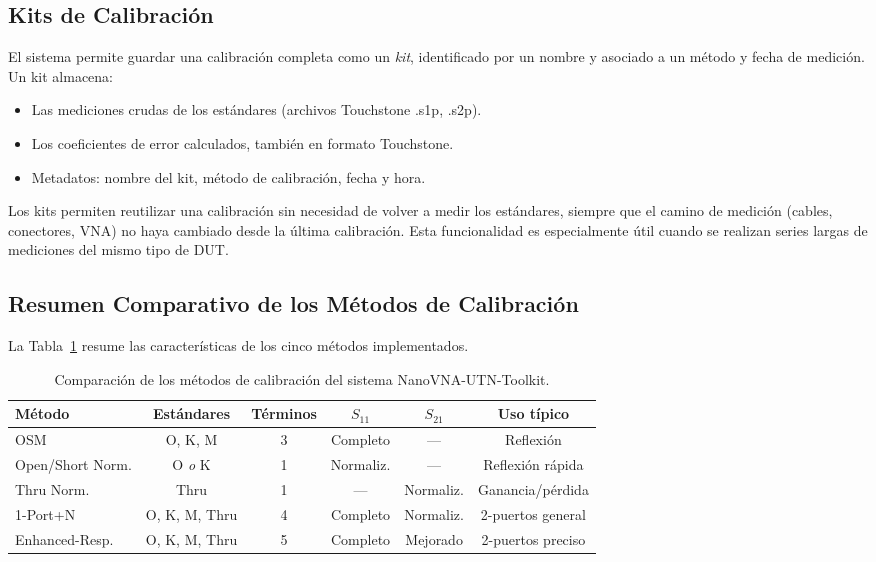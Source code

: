 \subsection{Kits de Calibración}
\label{sec:kits}

El sistema permite guardar una calibración completa como un \emph{kit},
identificado por un nombre y asociado a un método y fecha de medición.
Un kit almacena:

\begin{itemize}
    \item Las mediciones crudas de los estándares (archivos Touchstone .s1p,
          .s2p).
    \item Los coeficientes de error calculados, también en formato Touchstone.
    \item Metadatos: nombre del kit, método de calibración, fecha y hora.
\end{itemize}

Los kits permiten reutilizar una calibración sin necesidad de volver a medir
los estándares, siempre que el camino de medición (cables, conectores, VNA)
no haya cambiado desde la última calibración. Esta funcionalidad es
especialmente útil cuando se realizan series largas de mediciones del mismo
tipo de DUT.

\newpage
\Encabezado

\subsection{Resumen Comparativo de los Métodos de Calibración}
\label{sec:resumen_cal}

La Tabla~\ref{tab:comparacion_cal} resume las características de los cinco
métodos implementados.

\begin{table}[h!]
\centering
\caption{Comparación de los métodos de calibración del sistema NanoVNA-UTN-Toolkit.}
\label{tab:comparacion_cal}
\begin{tabular}{@{}lccccc@{}}
\toprule
\textbf{Método} &
\textbf{Estándares} &
\textbf{Términos} &
$S_{11}$ &
$S_{21}$ &
\textbf{Uso típico} \\
\midrule
OSM              & O, K, M        & 3 & Completo   & ---         & Reflexión \\
Open/Short Norm. & O \emph{o} K   & 1 & Normaliz.  & ---         & Reflexión rápida \\
Thru Norm.       & Thru           & 1 & ---         & Normaliz.   & Ganancia/pérdida \\
1-Port+N         & O, K, M, Thru  & 4 & Completo   & Normaliz.   & 2-puertos general \\
Enhanced-Resp.   & O, K, M, Thru  & 5 & Completo   & Mejorado    & 2-puertos preciso \\
\bottomrule
\end{tabular}
\end{table}

